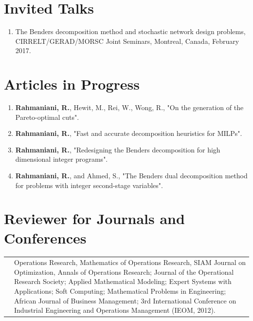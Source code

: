 \documentclass[10PT,letter]{article}
\newcounter{papercnt}
\newcommand{\numbox}[1]{} %
\begin{document}
\section*{\numbox{3}\bfseries\textcolor{titlecol}{\sffamily  Invited Talks }}                  
      \begin{enumerate}
      	\item The Benders decomposition method and stochastic network design problems, CIRRELT/GERAD/MORSC Joint Seminars, Montreal, Canada, February 2017.
      \end{enumerate}
  \section*{\numbox{6}\bfseries\textcolor{titlecol}{\sffamily Articles  in Progress}}
        \begin{enumerate}[itemsep=.5mm]
            \item 
            		\textbf{Rahmaniani, R.}, Hewit, M., Rei, W., Wong, R., "On the generation of the Pareto-optimal cuts".
			\item 
					\textbf{Rahmaniani, R.}, "Fast and accurate decomposition heuristics for MILPs".
		   \item 
					\textbf{Rahmaniani, R.}, "Redesigning the Benders decomposition for high dimensional integer programs".
		  \item 
					\textbf{Rahmaniani, R.}, and Ahmed, S., "The Benders dual decomposition method for problems with integer second-stage variables".
        \end{enumerate}
        \setcounter{papercnt}{\value{enumi}}

\section*{\numbox{6}\bfseries\textcolor{titlecol}{\sffamily Reviewer  for Journals and Conferences}}
\begin{tabular}{lp{6.5in}}
	   & Operations Research, Mathematics of Operations Research, SIAM Journal on Optimization, Annals of Operations Research; Journal of the Operational Research Society; Applied Mathematical Modeling; Expert Systems with Applications; Soft Computing; Mathematical Problems in Engineering; African Journal of Business Management; 3rd International Conference on Industrial Engineering and Operations Management (IEOM, 2012).
 \end{tabular}
\end{document}
